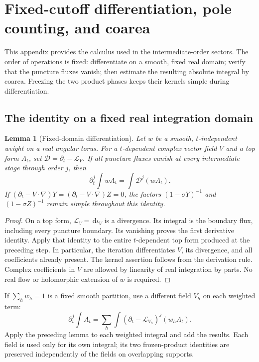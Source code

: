 \documentclass[11pt]{article}
\numberwithin{equation}{section}
\newtheorem{lemma}[theorem]{Lemma}
\theoremstyle{definition}
\newcommand{\dd}{\,\mathrm d}
\newcommand{\Li}{\mathcal L}
\begin{document}
\appendix
\section{Fixed-cutoff differentiation, pole counting, and coarea}
\label{app:lie}

This appendix provides the calculus used in the intermediate-order
sectors. The order of operations is fixed: differentiate on a smooth,
fixed real domain; verify that the puncture fluxes vanish; then estimate
the resulting absolute integral by coarea. Freezing the two product
phases keeps their kernels simple during differentiation.

\subsection{The identity on a fixed real integration domain}
\begin{lemma}[Fixed-domain differentiation]\label{lem:lie}
Let \(w\) be a smooth, \(t\)-independent weight on a real angular torus.
For a \(t\)-dependent complex vector field \(V\) and a top form \(A_t\),
set \(\mathcal D=\partial_t-\Li_V\). If all puncture fluxes vanish
at every intermediate stage through order \(j\), then
\[
 \partial_t^j\int wA_t=\int\mathcal D^j(wA_t).
\]
If \((\partial_t-V\cdot\nabla)Y
=(\partial_t-V\cdot\nabla)Z=0\), the factors
\((1-\sigma Y)^{-1}\) and \((1-\sigma Z)^{-1}\) remain simple throughout this identity.
\end{lemma}
\begin{proof}
On a top form, \(\Li_V=\dd\iota_V\) is a divergence. Its integral is the
boundary flux, including every puncture boundary. Its vanishing proves
the first derivative identity. Apply that identity to the entire
\(t\)-dependent top form produced at the preceding step. In particular,
the iteration differentiates \(V\), its divergence, and all coefficients
already present. The kernel assertion follows from the derivation rule.
Complex coefficients in \(V\) are allowed by linearity of real
integration by parts. No real flow or holomorphic extension of \(w\)
is required.
\end{proof}

If \(\sum_h w_h=1\) is a fixed smooth partition, use a different field
\(V_h\) on each weighted term:
\begin{equation}
 \partial_t^j\int A_t
   =\sum_h\int(\partial_t-\Li_{V_h})^j(w_hA_t).
 \label{eq:chartwiseLie}
\end{equation}
Apply the preceding lemma to each weighted integral and add the
results. Each field is used only for its own integral; its two
frozen-product identities are preserved independently of the fields
on overlapping supports.
\end{document}
